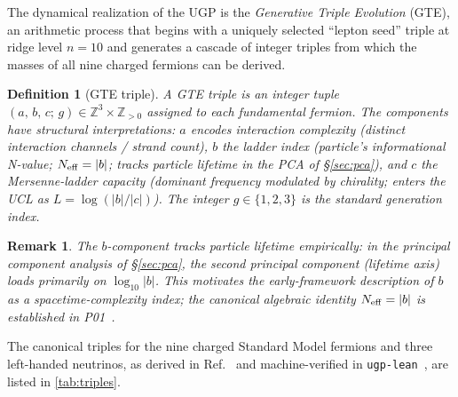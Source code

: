 \documentclass[12pt,a4paper]{article}
\newtheorem{definition}[theorem]{Definition}
\newtheorem{remark}[theorem]{Remark}
\begin{document}
The dynamical realization of the UGP is the \emph{Generative Triple
Evolution} (GTE), an arithmetic process that begins with a uniquely selected
``lepton seed'' triple at ridge level $n=10$ and generates a cascade of
integer triples from which the masses of all nine charged fermions can be
derived.

\begin{definition}[GTE triple]
\label{def:triple}
A GTE triple is an integer tuple $(a,\,b,\,c;\,g) \in \mathbb{Z}^3 \times
\mathbb{Z}_{>0}$ assigned to each fundamental fermion.
The components have structural interpretations: $a$ encodes
interaction complexity (distinct interaction channels / strand count), $b$ the ladder index
(particle's informational N-value; $N_{\rm eff} = |b|$; tracks particle lifetime in the PCA of
\S\ref{sec:pca}), and $c$ the Mersenne-ladder
capacity (dominant frequency modulated by chirality; enters the UCL as
$L = \log(|b|/|c|)$).
The integer $g \in \{1,2,3\}$ is the standard generation index.
\end{definition}

\begin{remark}
The $b$-component tracks particle lifetime empirically: in the principal
component analysis of \S\ref{sec:pca}, the second principal component
(lifetime axis) loads primarily on $\log_{10}|b|$.  This motivates the
early-framework description of $b$ as a spacetime-complexity index; the
canonical algebraic identity $N_{\rm eff} = |b|$ is established in
P01~\cite{Spivack2026_SM_UGP}.
\end{remark}

The canonical triples for the nine charged Standard Model fermions and three
left-handed neutrinos, as derived in
Ref.~\cite{Spivack2026_SM_UGP} and
machine-verified in \texttt{ugp-lean}~\cite{ugp-lean},
are listed in \cref{tab:triples}.
\end{document}
